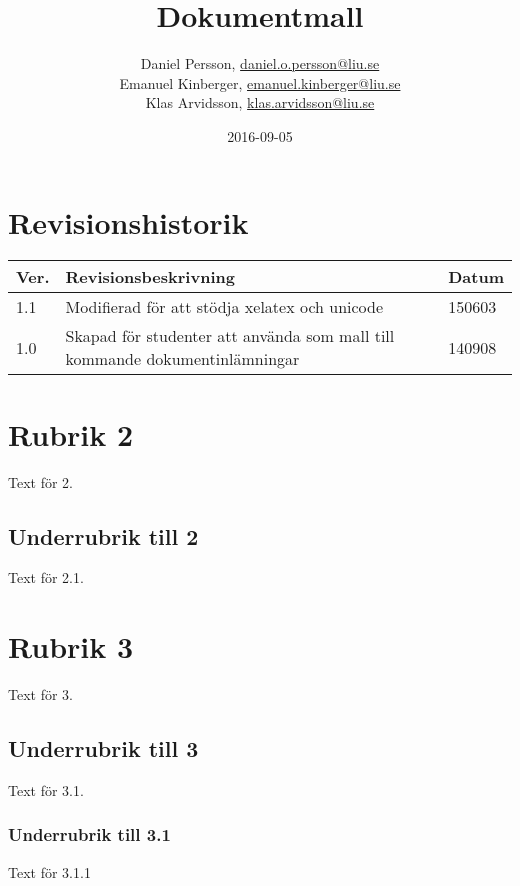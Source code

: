 \documentclass{TDP005mall}
\author{Daniel Persson, \url{daniel.o.persson@liu.se}\\
  Emanuel Kinberger, \url{emanuel.kinberger@liu.se}\\
  Klas Arvidsson, \url{klas.arvidsson@liu.se}}
\title{Dokumentmall}
\date{2016-09-05}
\begin{document}
\projectpage
\section{Revisionshistorik}
\begin{table}[!h]
\begin{tabularx}{\linewidth}{|l|X|l|}
\hline
Ver. & Revisionsbeskrivning & Datum \\\hline
1.1 & Modifierad för att stödja xelatex och unicode & 150603 \\\hline
1.0 & Skapad för studenter att använda som mall till
kommande dokumentinlämningar & 140908 \\\hline
\end{tabularx}
\end{table}


\section{Rubrik 2}
Text för 2.

\subsection{Underrubrik till 2}
Text för 2.1.

\section{Rubrik 3}
Text för 3.

\subsection{Underrubrik till 3}
Text för 3.1.

\subsubsection{Underrubrik till 3.1}
Text för 3.1.1
\end{document}
